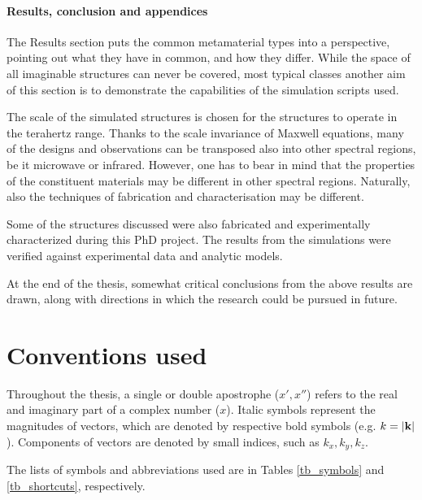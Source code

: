 \paragraph{Results, conclusion and appendices} %
The Results section puts the common metamaterial types into a perspective, pointing out what they have in common, and how they differ.  %
While the space of all imaginable structures can never be covered, most typical classes  another aim of this section is to demonstrate the capabilities of the simulation scripts used. 

The scale of the simulated structures is chosen for the structures to operate in the terahertz range. 
Thanks to the scale invariance of Maxwell equations, many of the designs and observations can be transposed also into other spectral regions, be it microwave or infrared. However, one has to bear in mind that the properties of the constituent materials may be different in other spectral regions. Naturally, also the techniques of fabrication and characterisation may be different.

Some of the structures discussed were also fabricated and experimentally characterized during this PhD project. 
The results from the simulations were verified against experimental data and analytic models.

At the end of the thesis, somewhat critical conclusions from the above results are drawn, along with directions in which the research could be pursued in future.


\section{Conventions used}%
Throughout the thesis, a single or double apostrophe ($x', x''$) refers to the real and imaginary part of a complex number ($x$). Italic symbols represent the magnitudes of vectors, which are denoted by respective bold symbols (e.g. $k = |{\mathbf{k}}|$). Components of vectors are denoted by small indices, such as $k_x, k_y, k_z$. 

The lists of symbols and abbreviations used are in Tables \ref{tb_symbols} and \ref{tb_shortcuts}, respectively.


